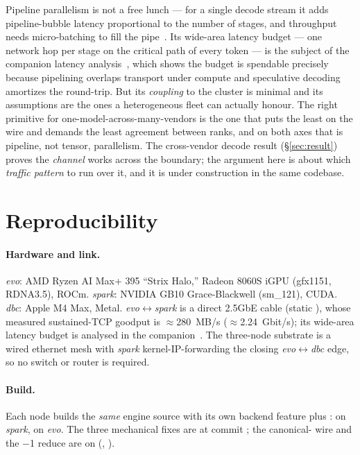 \documentclass[11pt]{article}
\begin{document}
Pipeline parallelism is not a free lunch --- for a single decode stream it adds pipeline-bubble latency
proportional to the number of stages, and throughput needs micro-batching to fill the
pipe~\cite{gpipe}. Its wide-area latency budget --- one network hop per stage on the critical path of
every token --- is the subject of the companion latency analysis~\cite{latency}, which shows the budget
is spendable precisely because pipelining overlaps transport under compute and speculative decoding
amortizes the round-trip. But its \emph{coupling} to the cluster is minimal and its assumptions are the
ones a heterogeneous fleet can actually honour. The right primitive for one-model-across-many-vendors is
the one that puts the least on the wire and demands the least agreement between ranks, and on both axes
that is pipeline, not tensor, parallelism. The cross-vendor decode result (\S\ref{sec:result}) proves the
\emph{channel} works across the boundary; the argument here is about which \emph{traffic pattern} to run
over it, and it is under construction in the same codebase.

\section{Reproducibility}
\label{sec:repro}

\paragraph{Hardware and link.} \emph{evo}: AMD Ryzen AI Max+ 395 ``Strix Halo,'' Radeon 8060S iGPU
(gfx1151, RDNA3.5), ROCm. \emph{spark}: NVIDIA GB10 Grace-Blackwell (sm\_121), CUDA. \emph{dbc}: Apple
M4 Max, Metal. \emph{evo}$\leftrightarrow$\emph{spark} is a direct 2.5GbE cable (static
), whose measured sustained-TCP goodput is $\approx$280~MB/s ($\approx$2.24~Gbit/s);
its wide-area latency budget is analysed in the companion~\cite{latency}. The three-node substrate is a
wired ethernet mesh with \emph{spark} kernel-IP-forwarding the closing \emph{evo}$\leftrightarrow$\emph{dbc}
edge, so no switch or router is required.

\paragraph{Build.} Each node builds the \emph{same} engine source with its own backend feature plus
:  on \emph{spark},  on \emph{evo}.
The three mechanical fixes are at commit ; the canonical- wire and the
$-$1 reduce are on  (,
).
\end{document}
